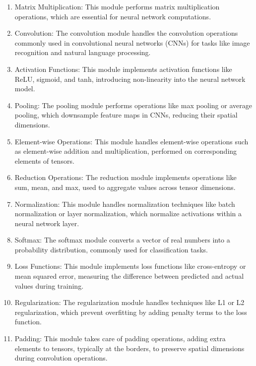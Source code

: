 \begin{enumerate}
\item{Matrix Multiplication: This module performs matrix multiplication operations, which are essential for neural network computations.}
\item{Convolution: The convolution module handles the convolution operations commonly used in convolutional neural networks (CNNs) for tasks like image recognition and natural language processing.}
\item{Activation Functions: This module implements activation functions like ReLU, sigmoid, and tanh, introducing non-linearity into the neural network model.}
\item{Pooling: The pooling module performs operations like max pooling or average pooling, which downsample feature maps in CNNs, reducing their spatial dimensions.}
\item{Element-wise Operations: This module handles element-wise operations such as element-wise addition and multiplication, performed on corresponding elements of tensors.}
\item{Reduction Operations: The reduction module implements operations like sum, mean, and max, used to aggregate values across tensor dimensions.}
\item{Normalization: This module handles normalization techniques like batch normalization or layer normalization, which normalize activations within a neural network layer.}
\item{Softmax: The softmax module converts a vector of real numbers into a probability distribution, commonly used for classification tasks.}
\item{Loss Functions: This module implements loss functions like cross-entropy or mean squared error, measuring the difference between predicted and actual values during training.}
\item{Regularization: The regularization module handles techniques like L1 or L2 regularization, which prevent overfitting by adding penalty terms to the loss function.}
\item{Padding: This module takes care of padding operations, adding extra elements to tensors, typically at the borders, to preserve spatial dimensions during convolution operations.}
\end{enumerate}